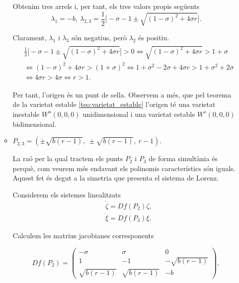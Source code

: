 \documentclass[11pt,a4paper,openright,oneside]{article}
\numberwithin{equation}{section}
\theoremstyle{definition}
\begin{document}
\begin{enumerate}
\begin{itemize}
        Obtenim tres arrels i, per tant, els tres valors propis següents
        \begin{equation*}
            \lambda_{1}=-b,\  \lambda_{2,3}=\frac{1}{2}\Big[-\sigma-1\pm\sqrt{(1-\sigma)^{2}+4\sigma r}\Big].
        \end{equation*}

        Clarament, $\lambda_1$ i $\lambda_3$ són negatius, però $\lambda_2$ és positiu. 
        \begin{equation*} \begin{split} \begin{aligned}
            &\frac{1}{2}\Big[-\sigma-1\pm\sqrt{(1-\sigma)^{2}+4\sigma r}\Big]>0 \iff \sqrt{(1-\sigma)^{2}+4\sigma r} > 1+\sigma \\ &\iff (1-\sigma)^{2}+4\sigma r > (1+\sigma)^{2} \iff 1+\sigma^{2}-2\sigma+4\sigma r > 1+\sigma^{2}+2\sigma \\ &\iff 4\sigma r > 4\sigma \iff r>1.
        \end{aligned} \end{split} \end{equation*}

        Per tant, l'origen és un punt de sella. Observem a més, que pel teorema de la varietat estable \ref{teo:varietat_estable} l'origen té una varietat inestable $W^u\left(0,0,0\right)$ unidimensional i una varietat estable $W^s\left(0,0,0\right)$ bidimensional.
    
        \item $P_{2,3}=\left(\pm\sqrt{b(r-1)},\ \pm\sqrt{b(r-1)},\ r-1\right)$.
    
        La raó per la qual tractem els punts $P_2$ i $P_3$ de forma simultània és perquè, com veurem més endavant els polinomis característics són iguals. Aquest fet és degut a la simetria que presenta el sistema de Lorenz.
    
        Considerem els sistemes linealitzats \begin{equation*}\begin{aligned}
            &\dot{\zeta}=Df\left(P_2\right)\zeta,\\
            &\dot{\xi}=Df\left(P_3\right)\xi.
        \end{aligned}\end{equation*}
   
        Calculem les matrius jacobianes corresponents 
    
        \begin{equation*}
            Df(P_2)= \begin{pmatrix}
            -\sigma & \sigma & 0\\
            1 & -1 & -\sqrt{b(r-1)}\\
            \sqrt{b(r-1)} & \sqrt{b(r-1)} & -b
        \end{pmatrix},\end{equation*}
        

\end{itemize}
\end{enumerate}
\end{document}
